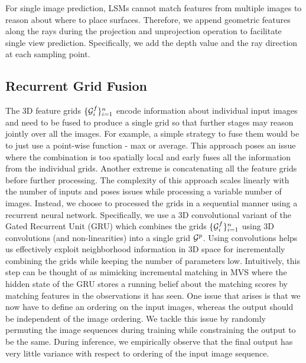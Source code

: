 \documentclass[../thesis.tex]{subfiles}
\begin{document}
For single image prediction, LSMs cannot match features from multiple images to reason about where to place surfaces. Therefore, we append geometric features along the rays during the projection and unprojection operation to facilitate single view prediction. Specifically, we add the depth value and the ray direction at each sampling point.

\subsection{Recurrent Grid Fusion}
The 3D feature grids $\{\mathcal{G}^f_i\}_{i=1}^n$ encode information about individual input images and need to be fused to produce a single grid so that further stages may reason jointly over all the images. For example, a simple strategy to fuse them would be to just use a point-wise function - \eg max or average. This approach poses an issue where the combination is too spatially local and early fuses all the information from the individual grids. Another extreme is concatenating all the feature grids before further processing. The complexity of this approach scales linearly with the number of inputs and poses issues while processing a variable number of images. 
Instead, we choose to processed the grids in a sequential manner using a recurrent neural network. Specifically, we use a 3D convolutional variant of the Gated Recurrent Unit (GRU) \cite{hochreiter1997long,chogru_2014,choy20163d} which combines the grids $\{\mathcal{G}^f_i\}_{i=1}^n$ using 3D convolutions (and non-linearities) into a single grid $\mathcal{G}^p$. Using convolutions helps us effectively exploit neighborhood information in 3D space for incrementally combining the grids while keeping the number of parameters low. Intuitively, this step can be thought of as mimicking incremental matching in MVS where the hidden state of the GRU stores a running belief about the matching scores by matching features in the observations it has seen. One issue that arises is that we now have to define an ordering on the input images, whereas the output should be independent of the image ordering. We tackle this issue by randomly permuting the image sequences during training while constraining the output to be the same. During inference, we empirically observe that the final output has very little variance with respect to ordering of the input image sequence.
\end{document}
